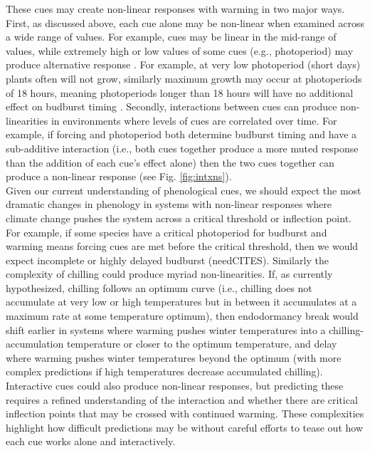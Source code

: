 \documentclass[11pt,letter]{article}
\begin{document}
These cues may create non-linear responses with warming in two major ways. First, as discussed above, each cue alone may be non-linear when examined across a wide range of values. For example, cues may be linear in the mid-range of values, while extremely high or low values of some cues (e.g., photoperiod) may produce alternative response \citep{gauzere2017}. For example, at very low photoperiod (short days) plants often will not grow, similarly maximum growth may occur at photoperiods of 18 hours, meaning photoperiods longer than 18 hours will have no additional effect on budburst timing \citep{major1980}. Secondly, interactions between cues can produce non-linearities in environments where levels of cues are correlated over time. For example, if forcing and photoperiod both determine budburst timing and have a sub-additive interaction (i.e., both cues together produce a more muted response than the addition of each cue's effect alone) then the two cues together can produce a non-linear response (see Fig. \ref{fig:intxns}). \\ %

Given our current understanding of phenological cues, we should expect the most dramatic changes in phenology in systems with non-linear responses where climate change pushes the system across a critical threshold or inflection point. For example, if some species have a critical photoperiod for budburst and warming means forcing cues are met before the critical threshold, then we would expect incomplete or highly delayed budburst (needCITES). Similarly the complexity of chilling could produce myriad non-linearities. If, as currently hypothesized, chilling follows an optimum curve (i.e., chilling does not accumulate at very low or high temperatures but in between it accumulates at a maximum rate at some temperature optimum), then endodormancy break would shift earlier in systems where warming pushes winter temperatures into a chilling-accumulation temperature or closer to the optimum temperature, and delay where warming pushes winter temperatures beyond the optimum (with more complex predictions if high temperatures decrease accumulated chilling). Interactive cues could also produce non-linear responses, but predicting these requires a refined understanding of the interaction and whether there are critical inflection points that may be crossed with continued warming. These complexities highlight how difficult predictions may be without careful efforts to tease out how each cue works alone and interactively. 
\end{document}
